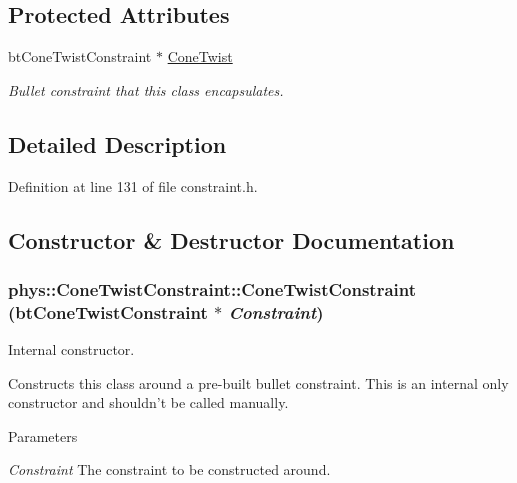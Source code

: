 \subsection*{Protected Attributes}
\begin{DoxyCompactItemize}
\item 
\hypertarget{classphys_1_1ConeTwistConstraint_a6bb25f6554b09cc9ce3afb7e1c46f074}{
btConeTwistConstraint $\ast$ \hyperlink{classphys_1_1ConeTwistConstraint_a6bb25f6554b09cc9ce3afb7e1c46f074}{ConeTwist}}
\label{da/dbc/classphys_1_1ConeTwistConstraint_a6bb25f6554b09cc9ce3afb7e1c46f074}

\begin{DoxyCompactList}\small\item\em Bullet constraint that this class encapsulates. \item\end{DoxyCompactList}\end{DoxyCompactItemize}


\subsection{Detailed Description}


Definition at line 131 of file constraint.h.



\subsection{Constructor \& Destructor Documentation}
\hypertarget{classphys_1_1ConeTwistConstraint_a38a9a0e7676d8ad8f77831a319bc007b}{
\subsubsection[{ConeTwistConstraint}]{\setlength{\rightskip}{0pt plus 5cm}phys::ConeTwistConstraint::ConeTwistConstraint (btConeTwistConstraint $\ast$ {\em Constraint})}}
\label{da/dbc/classphys_1_1ConeTwistConstraint_a38a9a0e7676d8ad8f77831a319bc007b}


Internal constructor. 

Constructs this class around a pre-\/built bullet constraint. This is an internal only constructor and shouldn't be called manually. 
\begin{DoxyParams}{Parameters}
\item[{\em Constraint}]The constraint to be constructed around. \end{DoxyParams}


